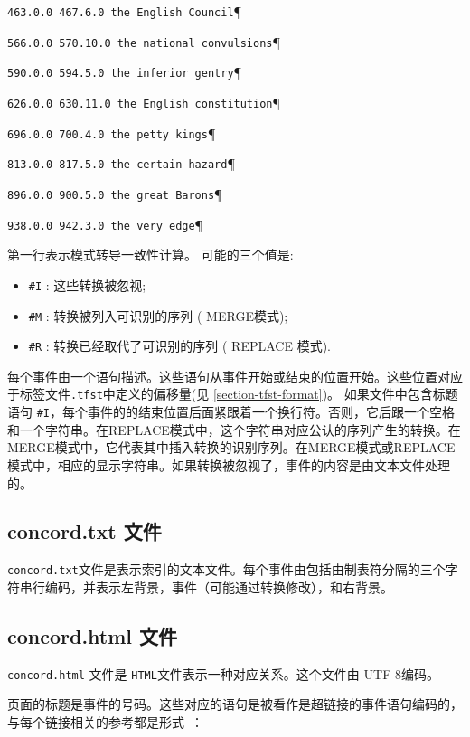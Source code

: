 \verb$463.0.0 467.6.0 the English Council$\P

\verb$566.0.0 570.10.0 the national convulsions$\P

\verb$590.0.0 594.5.0 the inferior gentry$\P

\verb$626.0.0 630.11.0 the English constitution$\P

\verb$696.0.0 700.4.0 the petty kings$\P

\verb$813.0.0 817.5.0 the certain hazard$\P

\verb$896.0.0 900.5.0 the great Barons$\P

\verb$938.0.0 942.3.0 the very edge$\P

\bigskip
\noindent 第一行表示模式转导一致性计算。
可能的三个值是:

\begin{itemize}
  \item \verb+#I+ : 这些转换被忽视;

  \item \verb+#M+ : 转换被列入可识别的序列 ( MERGE模式);
  
  \item \verb+#R+ : 转换已经取代了可识别的序列 ( REPLACE 模式).
\end{itemize}

\bigskip
\noindent 
每个事件由一个语句描述。这些语句从事件开始或结束的位置开始。这些位置对应于标签文件\verb$.tfst$中定义的偏移量(见 \ref{section-tfst-format})。
\bigskip
\noindent 
如果文件中包含标题语句 \verb+#I+，每个事件的的结束位置后面紧跟着一个换行符。否则，它后跟一个空格和一个字符串。在REPLACE模式中，这个字符串对应公认的序列产生的转换。在MERGE模式中，它代表其中插入转换的识别序列。在MERGE模式或REPLACE模式中，相应的显示字符串。如果转换被忽视了，事件的内容是由文本文件处理的。

\subsection{ concord.txt 文件}
 \verb+concord.txt+文件是表示索引的文本文件。每个事件由包括由制表符分隔的三个字符串行编码，并表示左背景，事件（可能通过转换修改），和右背景。
\subsection{concord.html 文件}
 \verb+concord.html+ 文件是 \verb+HTML+文件表示一种对应关系。这个文件由 UTF-8编码。


\bigskip
\noindent
页面的标题是事件的号码。这些对应的语句是被看作是超链接的事件语句编码的，与每个链接相关的参考都是形式~：

